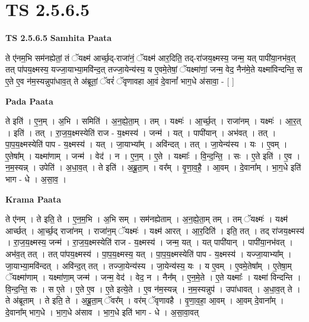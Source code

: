 \documentclass[17pt]{extarticle}
\begin{document}
\section*{ TS 2.5.6.5 }

\textbf{TS 2.5.6.5 } \newline
\textbf{Samhita Paata} \newline

ते ए॑नम॒भि सम॑नह्येतां॒ तं ॅयक्ष्म॑ आर्च्छ॒द्-राजा॑नं॒ ॅयक्ष्म॑ आर॒दिति॒ तद्-रा॑जय॒क्ष्मस्य॒ जन्म॒ यत् पापी॑या॒नभ॑व॒त् तत् पा॑पय॒क्ष्मस्य॒ यज्जा॒याभ्या॒मवि॑न्द॒त् तज्जा॒येन्य॑स्य॒ य ए॒वमे॒तेषां॒ ॅयक्ष्मा॑णां॒ जन्म॒ वेद॒ नैन॑मे॒ते यक्ष्मा॑विन्दन्ति॒ स ए॒ते ए॒व न॑म॒स्यन्नुपा॑धाव॒त् ते अ॑ब्रूतां॒ ॅवरं॑ ॅवृणावहा आ॒वं दे॒वानां᳚ भाग॒धे अ॑सावा॒ - [  ] \newline

\textbf{Pada Paata} \newline

ते इति॑ । ए॒न॒म् । अ॒भि । समिति॑ । अ॒न॒ह्ये॒ता॒म् । तम् । यक्ष्मः॑ । आ॒र्च्छ॒त् । राजा॑नम् । यक्ष्मः॑ । आ॒र॒त् । इति॑ । तत् । रा॒ज॒य॒क्ष्मस्येति॑ राज - य॒क्ष्मस्य॑ । जन्म॑ । यत् । पापी॑यान् । अभ॑वत् । तत् । पा॒प॒य॒क्ष्मस्येति॑ पाप - य॒क्ष्मस्य॑ । यत् । जा॒याभ्या᳚म् । अवि॑न्दत् । तत् । जा॒येन्य॑स्य । यः । ए॒वम् । ए॒तेषा᳚म् । यक्ष्मा॑णाम् । जन्म॑ । वेद॑ । न । ए॒न॒म् । ए॒ते । यक्ष्माः᳚ । वि॒न्द॒न्ति॒ । सः । ए॒ते इति॑ । ए॒व । न॒म॒स्यन्न् । उपेति॑ । अ॒धा॒व॒त् । ते इति॑ । अ॒ब्रू॒ता॒म् । वर᳚म् । वृ॒णा॒व॒है॒ । आ॒वम् । दे॒वाना᳚म् । भा॒ग॒धे इति॑ भाग - धे । अ॒सा॒व॒ ।  \newline


\textbf{Krama Paata} \newline

ते ए॑नम् । ते इति॒ ते । ए॒न॒म॒भि । अ॒भि सम् । सम॑नह्येताम् । अ॒न॒ह्ये॒ता॒म् तम् । तम् ॅयक्ष्मः॑ । यक्ष्म॑ आर्च्छत् । आ॒र्च्छ॒द् राजा॑नम् । राजा॑न॒म् ॅयक्ष्मः॑ । यक्ष्म॑ आरत् । आ॒र॒दिति॑ । इति॒ तत् । तद् रा॑जय॒क्ष्मस्य॑ । रा॒ज॒य॒क्ष्मस्य॒ जन्म॑ । रा॒ज॒य॒क्ष्मस्येति॑ राज - य॒क्ष्मस्य॑ । जन्म॒ यत् । यत् पापी॑यान् । पापी॑या॒नभ॑वत् । अभ॑व॒त् तत् । तत् पा॑पय॒क्ष्मस्य॑ । पा॒प॒य॒क्ष्मस्य॒ यत् । पा॒प॒य॒क्ष्मस्येति॑ पाप - य॒क्ष्मस्य॑ । यज्जा॒याभ्या᳚म् । जा॒याभ्या॒मवि॑न्दत् । अवि॑न्द॒त् तत् । तज्जा॒येन्य॑स्य । जा॒येन्य॑स्य॒ यः । य ए॒वम् । ए॒वमे॒तेषा᳚म् । ए॒तेषा॒म् ॅयक्ष्मा॑णाम् । यक्ष्मा॑णा॒म् जन्म॑ । जन्म॒ वेद॑ । वेद॒ न । नैन᳚म् । ए॒न॒मे॒ते । ए॒ते यक्ष्माः᳚ । यक्ष्मा॑ विन्दन्ति । वि॒न्द॒न्ति॒ सः । स ए॒ते । ए॒ते ए॒व । ए॒ते इत्ये॒ते । ए॒व न॑म॒स्यन्न् । न॒म॒स्यन्नुप॑ । उपा॑धावत् । अ॒धा॒व॒त् ते । ते अ॑ब्रूताम् । ते इति॒ ते । अ॒ब्रू॒ता॒म् ॅवर᳚म् । वर॑म् ॅवृणावहै । वृ॒णा॒व॒हा॒ आ॒वम् । आ॒वम् दे॒वाना᳚म् । दे॒वाना᳚म् भाग॒धे । भा॒ग॒धे अ॑साव । भा॒ग॒धे इति॑ भाग - धे । अ॒सा॒वा॒वत् \newline
\end{document}
